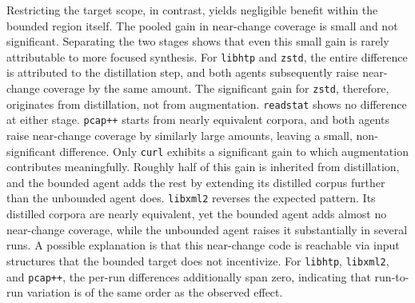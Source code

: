 Restricting the target scope, in contrast, yields negligible benefit within the bounded region itself.
The pooled gain in near-change coverage is small and not significant.
Separating the two stages shows that even this small gain is rarely attributable to more focused synthesis.
For \texttt{libhtp} and \texttt{zstd}, the entire difference is attributed to the distillation step, and both agents subsequently raise near-change coverage by the same amount.
The significant gain for \texttt{zstd}, therefore, originates from distillation, not from augmentation.
\texttt{readstat} shows no difference at either stage.
\texttt{pcap++} starts from nearly equivalent corpora, and both agents raise near-change coverage by similarly large amounts, leaving a small, non-significant difference.
Only \texttt{curl} exhibits a significant gain to which augmentation contributes meaningfully.
Roughly half of this gain is inherited from distillation, and the bounded agent adds the rest by extending its distilled corpus further than the unbounded agent does.
\texttt{libxml2} reverses the expected pattern.
Its distilled corpora are nearly equivalent, yet the bounded agent adds almost no near-change coverage, while the unbounded agent raises it substantially in several runs.
A possible explanation is that this near-change code is reachable via input structures that the bounded target does not incentivize.
For \texttt{libhtp}, \texttt{libxml2}, and \texttt{pcap++}, the per-run differences additionally span zero, indicating that run-to-run variation is of the same order as the observed effect.

